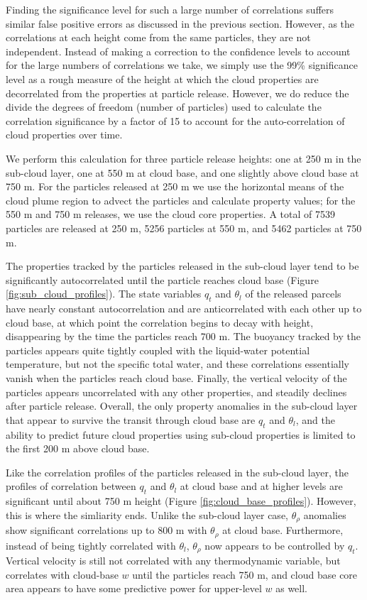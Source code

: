 \documentclass[acp]{copernicus}
\begin{document}
Finding the significance level for such a large number of correlations suffers 
similar false positive errors as discussed in the previous section.  However, 
as the correlations at each height come from the same particles, they are not 
independent.  Instead of making a correction to the confidence levels to 
account for the large numbers of correlations we take, we simply use the 99\% 
significance level as a rough measure of the height at which the cloud 
properties are decorrelated from the properties at particle release.  However, 
we do reduce the divide the degrees of freedom (number of particles) used to 
calculate the correlation significance by a factor of 15 to account for the 
auto-correlation of cloud properties over time.

We perform this calculation for three particle release heights: one at 250 m in 
the sub-cloud layer, one at 550 m at cloud base, and one slightly above cloud 
base at 750 m.  For the particles released at 250 m we use the horizontal means 
of the cloud plume region to advect the particles and calculate property values; 
for the 550 m and 750 m releases, we use the cloud core properties.  A total of 
7539 particles are released at 250 m, 5256 particles at 550 m, and 5462 
particles at 750 m.

The properties tracked by the particles released in the sub-cloud layer tend to 
be significantly autocorrelated until the particle reaches cloud base (Figure 
\ref{fig:sub_cloud_profiles}).  The state variables $q_t$ and $\theta_l$ of 
the released parcels have nearly constant autocorrelation and are 
anticorrelated with each other up to cloud base, at which point the correlation 
begins to decay with height, disappearing by the time the particles reach 
700 m.  The buoyancy tracked by the particles appears quite tightly coupled 
with the liquid-water potential temperature, but not the specific total water, 
and these correlations essentially vanish when the particles reach cloud base.  
Finally, the vertical velocity of the particles appears uncorrelated with any 
other properties, and steadily declines after particle release.  Overall, the 
only property anomalies in the sub-cloud layer that appear to survive the 
transit through cloud base are $q_t$ and $\theta_l$, and the ability to 
predict future cloud properties using sub-cloud properties is limited to the 
first 200 m above cloud base.

Like the correlation profiles of the particles released in the sub-cloud 
layer, the profiles of correlation between $q_t$ and $\theta_l$ at cloud base 
and at higher levels are significant until about 750 m height (Figure 
\ref{fig:cloud_base_profiles}).  However, this is where the simliarity ends.   
Unlike the sub-cloud layer case, $\theta_\rho$ anomalies show significant 
correlations up to 800 m with $\theta_\rho$ at cloud base.  Furthermore, 
instead of being tightly correlated with $\theta_l$, $\theta_\rho$ now 
appears to be controlled by $q_t$.  Vertical velocity is still not correlated 
with any thermodynamic variable, but correlates with cloud-base $w$ until the 
particles reach 750 m, and cloud base core area appears to have some predictive 
power for upper-level $w$ as well.
\end{document}
